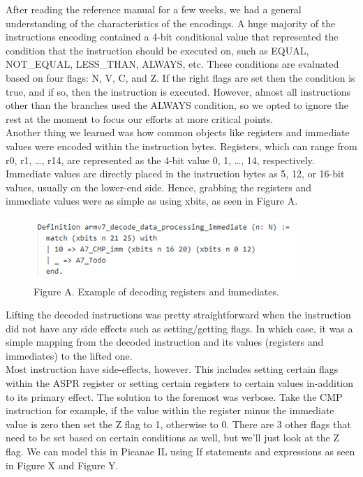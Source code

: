 \documentclass{article}
\begin{document}
After reading the reference manual for a few weeks, we had a general understanding of the characteristics of the encodings. A huge majority of the instructions encoding contained a 4-bit conditional value that represented the condition that the instruction should be executed on, such as EQUAL, NOT\_EQUAL, LESS\_THAN, ALWAYS, etc. These conditions are evaluated based on four flags: N, V, C, and Z. If the right flags are set then the condition is true, and if so, then the instruction is executed. However, almost all instructions other than the branches used the ALWAYS condition, so we opted to ignore the rest at the moment to focus our efforts at more critical points.\\

Another thing we learned was how common objects like registers and immediate values were encoded within the instruction bytes. Registers, which can range from r0, r1, …, r14, are represented as the 4-bit value 0, 1, …, 14, respectively. Immediate values are directly placed in the instruction bytes as 5, 12, or 16-bit values, usually on the lower-end side. Hence, grabbing the registers and immediate values were as simple as using xbits, as seen in Figure A.\\

\begin{figure}[h]
\includegraphics{decode_immediate_example.png}\\
Figure A. Example of decoding registers and immediates.
\centering
\end{figure}

Lifting the decoded instructions was pretty straightforward when the instruction did not have any side effects such as setting/getting flags. In which case, it was a simple mapping from the decoded instruction and its values (registers and immediates) to the lifted one.\\

Most instruction have side-effects, however. This includes setting certain flags within the ASPR register or setting certain registers to certain values in-addition to its primary effect. The solution to the foremost was verbose. Take the CMP instruction for example, if the value within the register minus the immediate value is zero then set the Z flag to 1, otherwise to 0. There are 3 other flags that need to be set based on certain conditions as well, but we’ll just look at the Z flag. We can model this in Picanae IL using If statements and expressions as seen in Figure X and Figure Y.\\
\end{document}
